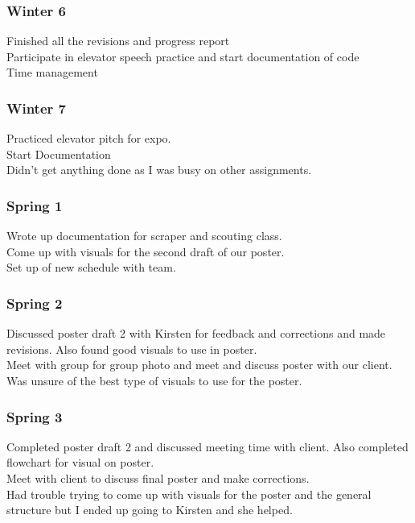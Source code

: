\subsubsection{Winter 6}
Finished all the revisions and progress report\\ Participate in elevator speech practice and start documentation of code\\ Time management\\

\subsubsection{Winter 7}
Practiced elevator pitch for expo.\\ Start Documentation\\ Didn't get anything done as I was busy on other assignments.\\

\subsubsection{Spring 1}
Wrote up documentation for scraper and scouting class.\\ Come up with visuals for the second draft of our poster.\\ Set up of new schedule with team.\\

\subsubsection{Spring 2}
Discussed poster draft 2 with Kirsten for feedback and corrections and made revisions. Also found good visuals to use in poster.\\ Meet with group for group photo and meet and discuss poster with our client.\\ Was unsure of the best type of visuals to use for the poster.\\

\subsubsection{Spring 3}
Completed poster draft 2 and discussed meeting time with client. Also completed flowchart for visual on poster.\\ Meet with client to discuss final poster and make corrections.\\ Had trouble trying to come up with visuals for the poster and the general structure but I ended up going to Kirsten and she helped.\\

